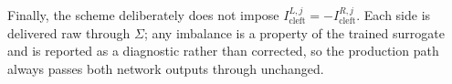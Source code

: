 \documentclass[11pt]{article}
\newcommand{\Icl}{I_{\mathrm{cleft}}}
\begin{document}
Finally, the scheme deliberately does not impose $\Icl^{L,j}=-\Icl^{R,j}$. Each
side is delivered raw through $\Sigma$; any imbalance is a property of the
trained surrogate and is reported as a diagnostic rather than corrected, so the
production path always passes both network outputs through unchanged.

\end{document}

